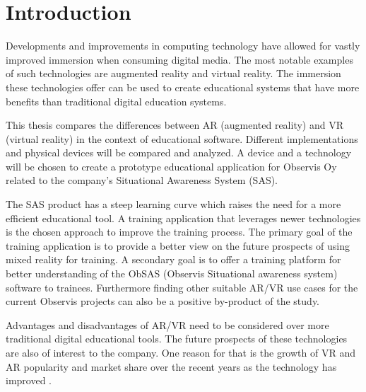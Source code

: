 \documentclass[12pt, a4paper,oneside, nocenter]{thesis}
\begin{document}
\newpage%
{
\tableofcontents
}

\newpage%



\chapter{\texorpdfstring{Introduction}{introduction}}
Developments and improvements in computing technology have allowed for vastly improved immersion when consuming digital media. The most notable examples of such technologies are augmented reality and virtual reality. The immersion these technologies offer can be used to create educational systems that have more benefits than traditional digital education systems. \par
This thesis compares the differences between AR (augmented reality) and VR (virtual reality) in the context of educational software. Different implementations and physical devices will be compared and analyzed. A device and a technology will be chosen to create a prototype educational application for Observis Oy related to the company's Situational Awareness System (SAS).
\par
The SAS product has a steep learning curve which raises the need for a more efficient educational tool. A training application that leverages newer technologies is the chosen approach to improve the training process. The primary goal of the training application is to provide a better view on the future prospects of using mixed reality for training. A secondary goal is to offer a training platform for better understanding of the ObSAS (Observis Situational awareness system) software to trainees. Furthermore finding other suitable AR/VR use cases for the current Observis projects can also be a positive by-product of the study.
\par
Advantages and disadvantages of AR/VR need to be considered over more traditional digital educational tools. The future prospects of these technologies are also of interest to the company. One reason for that is the growth of VR and AR popularity and market share over the recent years as the technology has improved .
\end{document}
